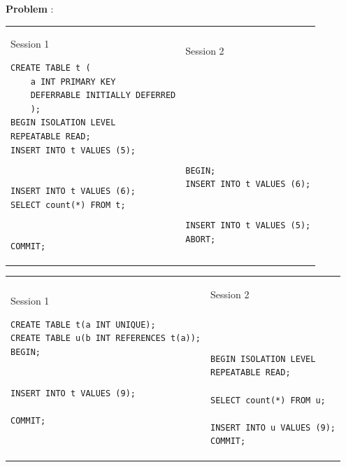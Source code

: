 \documentclass[10pt]{article}
\theoremstyle{definition}
\newcounter{ProblemCounter}
\newcommand{\nextproblem}{\filbreak\stepcounter{ProblemCounter} \noindent\textbf{Problem \theProblemCounter}:}
\begin{document}
\newpage
\nextproblem
\begin{tcolorbox}
\begin{tabular}{p{3.25in}p{3in}}
\hspace{-0.2in}Session 1
\begin{lstlisting}
CREATE TABLE t (
    a INT PRIMARY KEY
    DEFERRABLE INITIALLY DEFERRED
    );
BEGIN ISOLATION LEVEL
REPEATABLE READ;
INSERT INTO t VALUES (5);
  

INSERT INTO t VALUES (6);
SELECT count(*) FROM t;


COMMIT;
\end{lstlisting}
    &
\hspace{-0.2in}Session 2
\begin{lstlisting}







BEGIN;
INSERT INTO t VALUES (6);


INSERT INTO t VALUES (5);
ABORT;

\end{lstlisting}
\end{tabular}
\vspace{-0.2in}
\end{tcolorbox}
\vspace{0.25in}


\newpage
\begin{tcolorbox}
\begin{tabular}{p{3.25in}p{3in}}
\hspace{-0.2in}Session 1
\begin{lstlisting}
CREATE TABLE t(a INT UNIQUE);
CREATE TABLE u(b INT REFERENCES t(a));
BEGIN;


INSERT INTO t VALUES (9);

COMMIT;
  
\end{lstlisting}
    &
\hspace{-0.2in}Session 2
\begin{lstlisting}



BEGIN ISOLATION LEVEL
REPEATABLE READ;

SELECT count(*) FROM u;

INSERT INTO u VALUES (9);
COMMIT;
\end{lstlisting}
\end{tabular}
\vspace{-0.2in}
\end{tcolorbox}
\vspace{0.25in}
\end{document}
